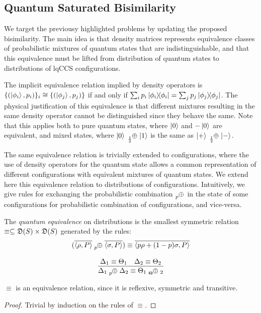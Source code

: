 
\subsection{Quantum Saturated Bisimilarity}

We target the previousy highlighted problems by updating the proposed bisimilarity. The main idea is that density matrices represents equivalence classes of probabilistic mixtures of quantum states that are indistinguishable, and that this equivalence must be lifted from distribution of quantum states to distributions of lqCCS configurations.

The implicit equivalence relation implied by density operators is $\{(\ket{\phi_i}, p_i)\}_i \cong \{(\ket{\phi_j}, p_j)\}$ if and only if $\sum_{i} p_i \ket{\phi_i}\!\!\bra{\phi_i} = \sum_{j} p_j \ket{\phi_j}\!\!\bra{\phi_j}$.
The physical justification of this equivalence is that different mixtures resulting in the same density operator cannot be distinguished since they behave the same. Note that this applies both to pure quantum states, where $\ket{0}$ and $-\ket{0}$ are equivalent, and  mixed states, where $\kz \psum{\frac{1}{2}} \ko$ is the same as $\kpl \psum{\frac{1}{2}} \km$.

The same equivalence relation is trivially extended to configurations, where the use of density operators for the quantum state allows a common representation of different configurations with equivalent mixtures of quantum states. 
We extend here this equivalence relation to distributions of configurations.
Intuitively, we give rules for exchanging the probabilistic combination $\psum{p}$ in the state of some configurations for probabilistic combination of configurations, and vice-versa. 

\begin{definition}
	The \emph{quantum equivalence} on distributions is the smallest  symmetric relation  $\equiv \subseteq \mathfrak{D}(S) \times \mathfrak{D}(S)$ generated by the rules:
	\begin{gather*}
	(\overline{\confw{\rho, P}} \psum{p} \overline{\confw{\sigma, P}}) \equiv \overline{\confw{p \rho + (1-p)\sigma, P}}
	\\[0.3cm]
	\infer{\Delta_1 \psum{p} \Delta_2 \equiv \Theta_1 \psum \Theta_2}{\Delta_1 \equiv \Theta_1 & \Delta_2 \equiv \Theta_2}
	\end{gather*}
	\end{definition}
	
	\begin{theorem}
	$\equiv$ is an equivalence relation, since it is reflexive, symmetric and transitive.
	\end{theorem}
	\begin{proof}
	Trivial by induction on the rules of $\equiv$.
	\end{proof}


